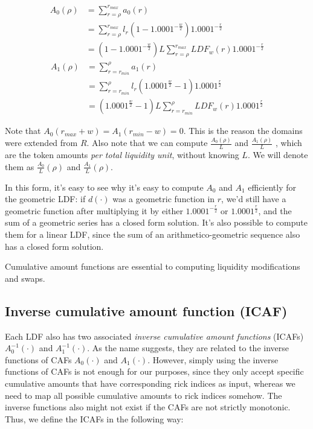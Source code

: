 \documentclass[twocolumn]{article}
\begin{document}
\begin{align}
A_0(\rho) &= \sum_{r = \rho}^{r_{max}} a_0(r) \\ 
          &= \sum_{r = \rho}^{r_{max}} l_r (1-1.0001^{-\frac{w}{2}})1.0001^{-\frac{r}{2}} \\ 
          &= (1-1.0001^{-\frac{w}{2}}) L \sum_{r = \rho}^{r_{max}} LDF_w(r) 1.0001^{-\frac{r}{2}}
\end{align}
\begin{align}
A_1(\rho) &= \sum_{r = r_{min}}^{\rho} a_1(r) \\
          &= \sum_{r = r_{min}}^{\rho} l_r(1.0001^\frac{w}{2} - 1) 1.0001^\frac{r}{2} \\ 
          &= (1.0001^\frac{w}{2} - 1) L \sum_{r = r_{min}}^{\rho} LDF_w(r) 1.0001^\frac{r}{2}
\end{align}

Note that $A_0(r_{max} + w) = A_1(r_{min}-w)=0$. This is the reason the domains were extended from $R$. Also note that we can compute $\frac{A_0(\rho)}{L}$ and $\frac{A_1(\rho)}{L}$ , which are the token amounts \textit{per total liquidity unit}, without knowing $L$. We will denote them as $\frac{A_0}{L}(\rho)$ and $\frac{A_1}{L}(\rho)$.

In this form, it's easy to see why it's easy to compute $A_0$ and $A_1$ efficiently for the geometric LDF: if $d(\cdot)$ was a geometric function in $r$, we'd still have a geometric function after multiplying it by either $1.0001^{-\frac{r}{2}}$ or $1.0001^{\frac{r}{2}}$, and the sum of a geometric series has a closed form solution. It's also possible to compute them for a linear LDF, since the sum of an arithmetico-geometric sequence also has a closed form solution.

Cumulative amount functions are essential to computing liquidity modifications and swaps.

\subsection{Inverse cumulative amount function (ICAF)}

Each LDF also has two associated \textit{inverse cumulative amount functions} (ICAFs) $A_0^{-1}(\cdot)$ and $A_1^{-1}(\cdot)$. As the name suggests, they are related to the inverse functions of CAFs $A_0(\cdot)$ and $A_1(\cdot)$. However, simply using the inverse functions of CAFs is not enough for our purposes, since they only accept specific cumulative amounts that have corresponding rick indices as input, whereas we need to map all possible cumulative amounts to rick indices somehow.  The inverse functions also might not exist if the CAFs are not strictly monotonic. Thus, we define the ICAFs in the following way:
\end{document}
